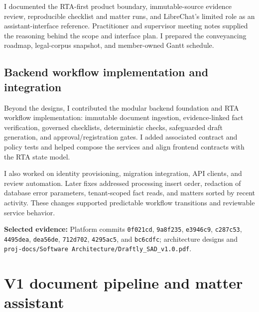 \documentclass[11pt,a4paper]{article}
\newcommand{\evidence}[1]{\par{\small\textbf{Selected evidence:} #1}\par}
\newcommand{\repo}[1]{\texttt{\nolinkurl{#1}}}
\begin{document}
I documented the RTA-first product boundary, immutable-source evidence review, reproducible checklist and matter runs, and LibreChat's limited role as an assistant-interface reference. Practitioner and supervisor meeting notes supplied the reasoning behind the scope and interface plan. I prepared the conveyancing roadmap, legal-corpus snapshot, and member-owned Gantt schedule.

\subsection{Backend workflow implementation and integration}
Beyond the designs, I contributed the modular backend foundation and RTA workflow implementation: immutable document ingestion, evidence-linked fact verification, governed checklists, deterministic checks, safeguarded draft generation, and approval/registration gates. I added associated contract and policy tests and helped compose the services and align frontend contracts with the RTA state model.

I also worked on identity provisioning, migration integration, API clients, and review automation. Later fixes addressed processing insert order, redaction of database error parameters, tenant-scoped fact reads, and matters sorted by recent activity. These changes supported predictable workflow transitions and reviewable service behavior.

\evidence{Platform commits \repo{0f021cd}, \repo{9a8f235}, \repo{e3946c9}, \repo{c287c53}, \repo{4495dea}, \repo{dea56de}, \repo{712d702}, \repo{4295ac5}, and \repo{bc6cdfc}; architecture designs and \repo{proj-docs/Software Architecture/Draftly_SAD_v1.0.pdf}.}

\newpage
\section{V1 document pipeline and matter assistant}
\end{document}
